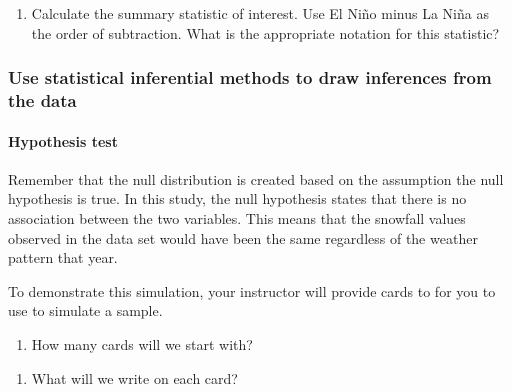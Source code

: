 \documentclass[
]{report}
\providecommand{\tightlist}{%
  \setlength{\itemsep}{0pt}\setlength{\parskip}{0pt}}
\newcommand\latexcode[1]{#1}
\begin{document}
\begin{enumerate}
\def\labelenumi{\arabic{enumi}.}
\setcounter{enumi}{8}
\tightlist
\item
  Calculate the summary statistic of interest. Use El Ni\latexcode{\~{n}}o minus La Ni\latexcode{\~{n}}a as the order of subtraction. What is the appropriate notation for this statistic?
\end{enumerate}

\vspace{0.5in}

\newpage

\hypertarget{use-statistical-inferential-methods-to-draw-inferences-from-the-data-3}{%
\subsubsection*{Use statistical inferential methods to draw inferences from the data}\label{use-statistical-inferential-methods-to-draw-inferences-from-the-data-3}}

\hypertarget{hypothesis-test-2}{%
\paragraph*{Hypothesis test}\label{hypothesis-test-2}}

Remember that the null distribution is created based on the assumption the null hypothesis is true. In this study, the null hypothesis states that there is no association between the two variables. This means that the snowfall values observed in the data set would have been the same regardless of the weather pattern that year.

To demonstrate this simulation, your instructor will provide cards to for you to use to simulate a sample.

\begin{enumerate}
\def\labelenumi{\arabic{enumi}.}
\setcounter{enumi}{9}
\tightlist
\item
  How many cards will we start with?
\end{enumerate}

\vspace{0.3in}

\begin{enumerate}
\def\labelenumi{\arabic{enumi}.}
\setcounter{enumi}{10}
\tightlist
\item
  What will we write on each card?
\end{enumerate}
\end{document}

